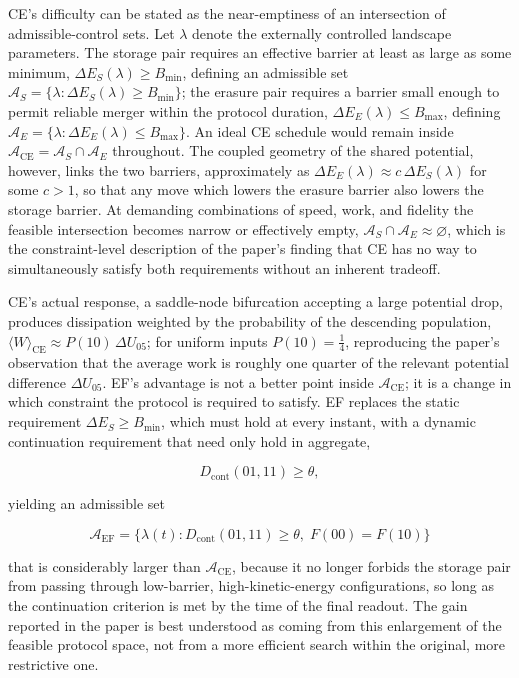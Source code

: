 \documentclass[11pt]{article}
\begin{document}
CE's difficulty can be stated as the near-emptiness of an intersection of admissible-control sets. Let $\lambda$ denote the externally controlled landscape parameters. The storage pair requires an effective barrier at least as large as some minimum, $\Delta E_S(\lambda)\ge B_{\min}$, defining an admissible set $\mathcal A_S=\{\lambda:\Delta E_S(\lambda)\ge B_{\min}\}$; the erasure pair requires a barrier small enough to permit reliable merger within the protocol duration, $\Delta E_E(\lambda)\le B_{\max}$, defining $\mathcal A_E=\{\lambda:\Delta E_E(\lambda)\le B_{\max}\}$. An ideal CE schedule would remain inside $\mathcal A_{\mathrm{CE}}=\mathcal A_S\cap\mathcal A_E$ throughout. The coupled geometry of the shared potential, however, links the two barriers, approximately as $\Delta E_E(\lambda)\approx c\,\Delta E_S(\lambda)$ for some $c>1$, so that any move which lowers the erasure barrier also lowers the storage barrier. At demanding combinations of speed, work, and fidelity the feasible intersection becomes narrow or effectively empty, $\mathcal A_S\cap\mathcal A_E\approx\varnothing$, which is the constraint-level description of the paper's finding that CE has no way to simultaneously satisfy both requirements without an inherent tradeoff.

CE's actual response, a saddle-node bifurcation accepting a large potential drop, produces dissipation weighted by the probability of the descending population, $\langle W\rangle_{\mathrm{CE}}\approx P(10)\,\Delta U_{05}$; for uniform inputs $P(10)=\tfrac14$, reproducing the paper's observation that the average work is roughly one quarter of the relevant potential difference $\Delta U_{05}$. EF's advantage is not a better point inside $\mathcal A_{\mathrm{CE}}$; it is a change in which constraint the protocol is required to satisfy. EF replaces the static requirement $\Delta E_S\ge B_{\min}$, which must hold at every instant, with a dynamic continuation requirement that need only hold in aggregate,

\[
D_{\mathrm{cont}}(01,11)\ge\theta,
\]

yielding an admissible set

\[
\mathcal A_{\mathrm{EF}} = \bigl\{\lambda(t): D_{\mathrm{cont}}(01,11)\ge\theta,\; F(00)=F(10)\bigr\}
\]

that is considerably larger than $\mathcal A_{\mathrm{CE}}$, because it no longer forbids the storage pair from passing through low-barrier, high-kinetic-energy configurations, so long as the continuation criterion is met by the time of the final readout. The gain reported in the paper is best understood as coming from this enlargement of the feasible protocol space, not from a more efficient search within the original, more restrictive one.
\end{document}
